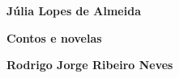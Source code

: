 \textbf{Júlia Lopes de Almeida} \lipsum[1]

\textbf{Contos e novelas} \lipsum[2]

\textbf{Rodrigo Jorge Ribeiro Neves} \lipsum[3]







